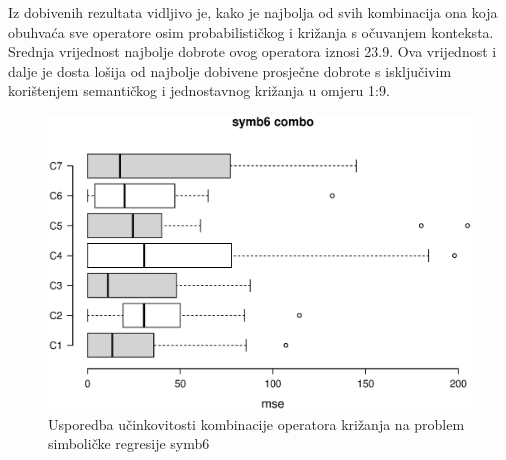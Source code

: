 Iz dobivenih rezultata vidljivo je, kako je najbolja od svih kombinacija ona koja obuhvaća sve operatore osim probabilističkog i križanja s očuvanjem konteksta. Srednja vrijednost najbolje dobrote ovog operatora iznosi 23.9. Ova vrijednost i dalje je dosta lošija od najbolje dobivene prosječne dobrote s isključivim korištenjem semantičkog i jednostavnog križanja u omjeru 1:9.

\begin{figure}[H]
	\centering
	\includegraphics[trim=4cm 4cm 0cm 0cm, scale=0.6]{./slike/boxPlots/symb6-combo.eps}
	\caption{Usporedba učinkovitosti kombinacije operatora križanja na problem simboličke regresije symb6}
	\label{symb6combo}
\end{figure}
